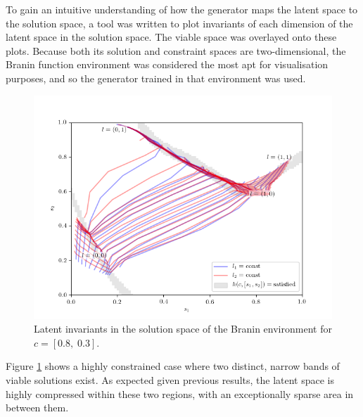 \documentclass[../../main.tex]{subfiles}
\begin{document}
To gain an intuitive understanding of how the generator maps the latent space to the solution space, a tool was written to plot invariants of each dimension of the latent space in the solution space.
The viable space was overlayed onto these plots.
Because both its solution and constraint spaces are two-dimensional, the Branin function environment was considered the most apt for visualisation purposes, and so the generator trained in that environment was used.
\begin{figure}[H]
    \begin{center}
    \includegraphics[width=\textwidth]{latentPlot0803}
    \caption{
        Latent invariants in the solution space of the Branin environment for $c=[0.8,\;0.3]$.
    }
    \label{fig:latentPlot0803}
    \end{center}
\end{figure}
Figure \ref{fig:latentPlot0803} shows a highly constrained case where two distinct, narrow bands of viable solutions exist.
As expected given previous results, the latent space is highly compressed within these two regions, with an exceptionally sparse area in between them.
\end{document}
